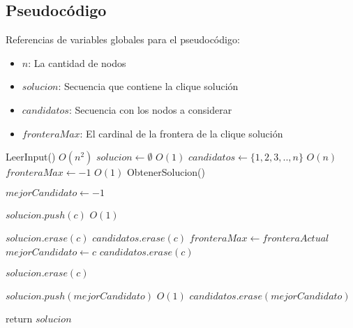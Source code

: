 \subsection{Pseudocódigo}

Referencias de variables globales para el pseudocódigo:
\begin{itemize}
    \item $n$: La cantidad de nodos
    \item $solucion$: Secuencia que contiene la clique solución
    \item $candidatos$: Secuencia con los nodos a considerar
    \item $fronteraMax$: El cardinal de la frontera de la clique solución
\end{itemize}


\begin{algorithm}[H]
\begin{algorithmic}
    \State LeerInput() \Comment $O(n^2)$
    \State $solucion \gets \emptyset$ \Comment $O(1)$
    \State $candidatos \gets \{1, 2, 3, .. , n\} $ \Comment $O(n)$
    \State $fronteraMax \gets -1$  \Comment $O(1)$
    \State ObtenerSolucion()
\EndFunction
\end{algorithmic}
\end{algorithm}



\begin{algorithm}[H]
\begin{algorithmic}


        \State $mejorCandidato \gets -1$

            \State $solucion.push(c)$ \Comment $O(1)$

                \State $solucion.erase(c)$
                \State $candidatos.erase(c)$
            \Else
                    \State $fronteraMax \gets fronteraActual$
                    \State $mejorCandidato \gets c$
                \Else
                    \State $candidatos.erase(c)$
                \EndIf

                \State $solucion.erase(c)$
            \EndIf
        \EndFor

            \State $solucion.push(mejorCandidato)$ \Comment $O(1)$
            \State $candidatos.erase(mejorCandidato)$

        \EndIf
    \EndWhile

    \State return $solucion$

\EndFunction

\end{algorithmic}
\end{algorithm}


